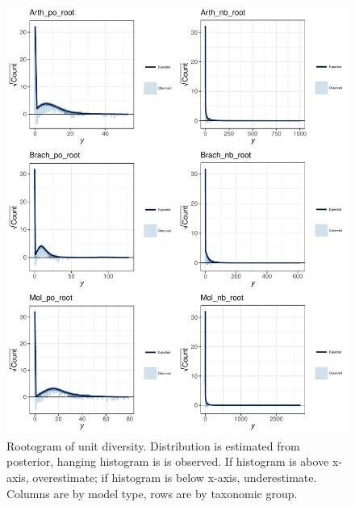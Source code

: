 \documentclass[12pt,letterpaper]{article}
\begin{document}
\afterpage{\clearpage}
\begin{figure}[h]
  \centering
  \includegraphics[width=\textwidth,height=0.8\textheight,keepaspectratio=true]{figure/ppc_root}
  \caption{Rootogram of unit diversity. Distribution is estimated from posterior, hanging histogram is is observed. If histogram is above x-axis, overestimate; if histogram is below x-axis, underestimate. Columns are by model type, rows are by taxonomic group.}
  \label{fig:ppc_root}
\end{figure}
\end{document}
